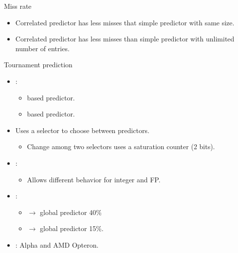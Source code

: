 \begin{frame}[t]{Miss rate}
\begin{itemize}
  \item Correlated predictor has less misses that simple predictor with same size.
  \item Correlated predictor has less misses than simple predictor with unlimited number of entries.
\end{itemize}

\end{frame}


\begin{frame}[t]{Tournament prediction}
\begin{itemize}
  \item {}:
    \begin{itemize}
      \item {} based predictor.
      \item {} based predictor.
    \end{itemize}
  \item Uses a selector to choose between predictors.
    \begin{itemize}
      \item Change among two selectors uses a saturation counter (2 bits).
    \end{itemize}
  \item {}:
    \begin{itemize}
      \item Allows different behavior for integer and FP.
    \end{itemize}
  \item {}:
    \begin{itemize}
      \item {} $\rightarrow$ global predictor 40\%
      \item {} $\rightarrow$ global predictor 15\%.
    \end{itemize}
  \item {}: Alpha and AMD Opteron.
\end{itemize}
\end{frame}


